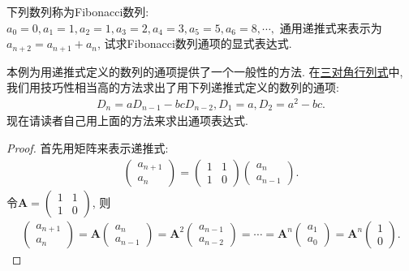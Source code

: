 \documentclass[../../main.tex]{subfiles}%
\begin{document}
\begin{example}
下列数列称为Fibonacci数列:
\(a_{0}=0,a_{1}=1,a_{2}=1,a_{3}=2,a_{4}=3,a_{5}=5,a_{6}=8,\cdots,\)
通用递推式来表示为\(a_{n + 2}=a_{n + 1}+a_{n}\), 试求Fibonacci数列通项的显式表达式.
\end{example}
\begin{remark}
本例为用递推式定义的数列的通项提供了一个一般性的方法. 在\hyperref[三对角行列式]{三对角行列式}中, 我们用技巧性相当高的方法求出了用下列递推式定义的数列的通项:
\begin{align*}
D_{n}=aD_{n - 1}-bcD_{n - 2},D_{1}=a,D_{2}=a^{2}-bc.
\end{align*}
现在请读者自己用上面的方法来求出通项表达式. 
\end{remark}
\begin{proof}

首先用矩阵来表示递推式:
\begin{align*}
\begin{pmatrix}
a_{n + 1}\\
a_{n}
\end{pmatrix}=\begin{pmatrix}
1&1\\
1&0
\end{pmatrix}\begin{pmatrix}
a_{n}\\
a_{n - 1}
\end{pmatrix}.
\end{align*}
令\(\boldsymbol{A}=\begin{pmatrix}
1&1\\
1&0
\end{pmatrix}\), 则
\begin{align*}
\begin{pmatrix}
a_{n + 1}\\
a_{n}
\end{pmatrix}=\boldsymbol{A}\begin{pmatrix}
a_{n}\\
a_{n - 1}
\end{pmatrix}=\boldsymbol{A}^{2}\begin{pmatrix}
a_{n - 1}\\
a_{n - 2}
\end{pmatrix}=\cdots=\boldsymbol{A}^{n}\begin{pmatrix}
a_{1}\\
a_{0}
\end{pmatrix}=\boldsymbol{A}^{n}\begin{pmatrix}
1\\
0
\end{pmatrix}.

\end{align*}
\end{proof}
\end{document}
